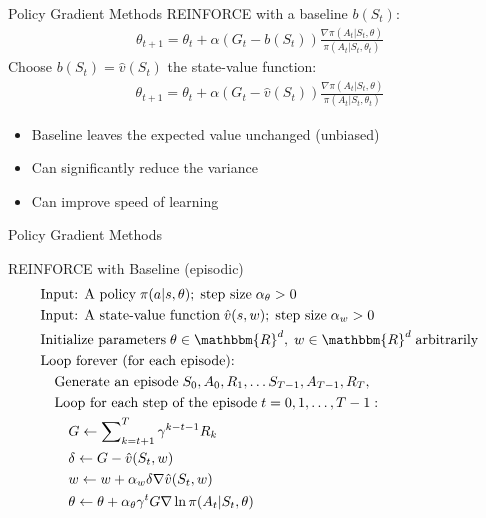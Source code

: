\documentclass[ignorenonframetext,xcolor=x11names]{beamer}
\begin{document}
\begin{frame}[label=full]{Policy Gradient Methods}
REINFORCE with a baseline $b(S_t)$:
\begin{align*}
\theta_{t+1} = \theta_t + \alpha(G_t - b(S_t)) \frac{\nabla \pi(A_t | S_t, \theta)}{\pi(A_t | S_t, \theta_t)}
\end{align*}
Choose $b(S_t) = \hat{v}(S_t)$ the state-value function:
\begin{align*}
\theta_{t+1} = \theta_t + \alpha(G_t - \hat{v}(S_t)) \frac{\nabla \pi(A_t | S_t, \theta)}{\pi(A_t | S_t, \theta_t)}
\end{align*}
\begin{itemize}
   \item Baseline leaves the expected value unchanged (unbiased)
   \item Can significantly reduce the variance
   \item Can improve speed of learning
\end{itemize} 
\end{frame}

\begin{frame}[label=full]{Policy Gradient Methods}
\begin{block}{REINFORCE with Baseline (episodic)}
\vspace{-.5\baselineskip}
\begin{align*}
& \text{Input: A policy}\;\pi(a | s, \theta);\;\text{step size}\; \alpha_\theta > 0 \\
& \text{Input: A state-value function}\;\hat{v}(s, w);\;\text{step size}\; \alpha_w > 0 \\
& \text{Initialize parameters}\; \theta \in \mathbbm{R}^d,\; w \in \mathbbm{R}^d\;\text{arbitrarily} \\
& \text{Loop forever (for each episode):} \\
& \quad \text{Generate an episode}\; S_0, A_0, R_1, \ldots S_{T-1}, A_{T-1}, R_T, \\
& \quad \text{Loop for each step of the episode}\;t=0, 1, \ldots, T-1:\\
& \quad \quad G \leftarrow \sum\nolimits_{k=t+1}^T \gamma^{k - t - 1}R_k \\
& \quad \quad \delta \leftarrow G - \hat{v}(S_t, w) \\
& \quad \quad w \leftarrow w + \alpha_w \delta \nabla \hat{v}(S_t, w) \\
& \quad \quad \theta \leftarrow \theta + \alpha_\theta \gamma^t G \nabla \ln \pi(A_t | S_t, \theta)
\end{align*}
\vspace{-.5\baselineskip}
\end{block}
\end{frame}
\end{document}

